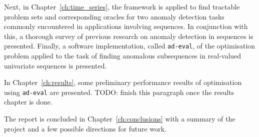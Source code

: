 Next, in Chapter~\ref{ch:time_series}, the framework is applied to find tractable problem sets and corresponding oracles for two anomaly detection tasks commonly encountered in applications involving sequences. In conjunction with this, a thorough survey of previous research on anomaly detection in sequences is presented. Finally, a software implementation, called \texttt{ad-eval}, of the optimisation problem applied to the task of finding anomalous subsequences in real-valued univariate sequences is presented.

In Chapter~\ref{ch:results}, some preliminary performance results of optimisation using \texttt{ad-eval} are presented. TODO: finish this paragraph once the results chapter is done.

The report is concluded in Chapter~\ref{ch:conclusions} with a summary of the project and a few possible directions for future work.
